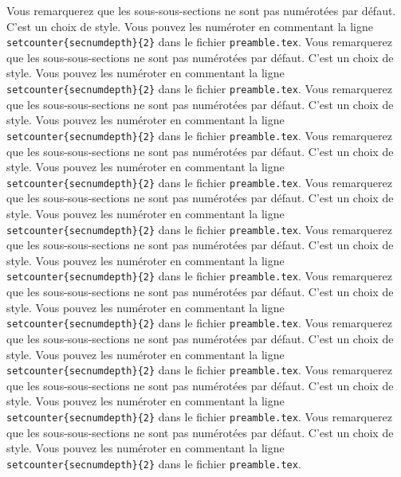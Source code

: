 Vous remarquerez que les sous-sous-sections ne sont pas numérotées par défaut. C'est un choix de style. Vous pouvez les numéroter en commentant la ligne \texttt{\\setcounter\{secnumdepth\}\{2\}} dans le fichier \texttt{preamble.tex}.
Vous remarquerez que les sous-sous-sections ne sont pas numérotées par défaut. C'est un choix de style. Vous pouvez les numéroter en commentant la ligne \texttt{\\setcounter\{secnumdepth\}\{2\}} dans le fichier \texttt{preamble.tex}.
Vous remarquerez que les sous-sous-sections ne sont pas numérotées par défaut. C'est un choix de style. Vous pouvez les numéroter en commentant la ligne \texttt{\\setcounter\{secnumdepth\}\{2\}} dans le fichier \texttt{preamble.tex}.
Vous remarquerez que les sous-sous-sections ne sont pas numérotées par défaut. C'est un choix de style. Vous pouvez les numéroter en commentant la ligne \texttt{\\setcounter\{secnumdepth\}\{2\}} dans le fichier \texttt{preamble.tex}.
Vous remarquerez que les sous-sous-sections ne sont pas numérotées par défaut. C'est un choix de style. Vous pouvez les numéroter en commentant la ligne \texttt{\\setcounter\{secnumdepth\}\{2\}} dans le fichier \texttt{preamble.tex}.
Vous remarquerez que les sous-sous-sections ne sont pas numérotées par défaut. C'est un choix de style. Vous pouvez les numéroter en commentant la ligne \texttt{\\setcounter\{secnumdepth\}\{2\}} dans le fichier \texttt{preamble.tex}.
Vous remarquerez que les sous-sous-sections ne sont pas numérotées par défaut. C'est un choix de style. Vous pouvez les numéroter en commentant la ligne \texttt{\\setcounter\{secnumdepth\}\{2\}} dans le fichier \texttt{preamble.tex}.
Vous remarquerez que les sous-sous-sections ne sont pas numérotées par défaut. C'est un choix de style. Vous pouvez les numéroter en commentant la ligne \texttt{\\setcounter\{secnumdepth\}\{2\}} dans le fichier \texttt{preamble.tex}.
Vous remarquerez que les sous-sous-sections ne sont pas numérotées par défaut. C'est un choix de style. Vous pouvez les numéroter en commentant la ligne \texttt{\\setcounter\{secnumdepth\}\{2\}} dans le fichier \texttt{preamble.tex}.
Vous remarquerez que les sous-sous-sections ne sont pas numérotées par défaut. C'est un choix de style. Vous pouvez les numéroter en commentant la ligne \texttt{\\setcounter\{secnumdepth\}\{2\}} dans le fichier \texttt{preamble.tex}.
